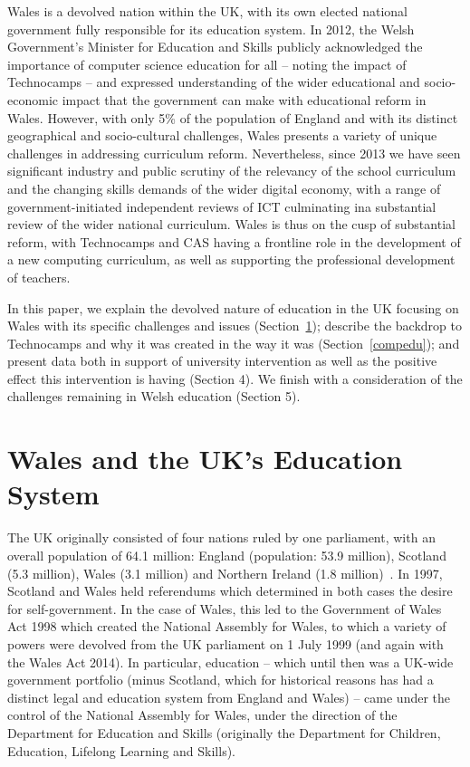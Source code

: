 \documentclass{sig-alternate}
\begin{document}
Wales is a devolved nation within the UK, with its own elected
national government fully responsible for its education system. In
2012, the Welsh Government's Minister for Education and Skills
publicly acknowledged the importance of computer science education for
all -- noting the impact of Technocamps -- and expressed understanding
of the wider educational and socio-economic impact that the government
can make with educational reform in Wales.  However, with only 5\% of
the population of England and with its distinct geographical and
socio-cultural challenges, Wales presents a variety of unique
challenges in addressing curriculum reform. Nevertheless, since 2013
we have seen significant industry and public scrutiny of the relevancy
of the school curriculum and the changing skills demands of the wider
digital economy, with a range of government-initiated independent
reviews of ICT culminating ina substantial review of the wider
national curriculum. Wales is thus on the cusp of substantial reform,
with Technocamps and CAS having a frontline role in the development of
a new computing curriculum, as well as supporting the professional
development of teachers.

In this paper, we explain the devolved nature of education in the UK
focusing on Wales with its specific challenges and issues
(Section~\ref{welshukedu}); describe the backdrop to Technocamps and
why it was created in the way it was (Section~\ref{compedu}); and
present data both in support of university intervention as well as the
positive effect this intervention is having (Section 4).  We finish
with a consideration of the challenges remaining in Welsh education
(Section 5).

\section{Wales and the UK's Education System}\label{welshukedu}

The UK originally consisted of four nations ruled by one parliament,
with an overall population of 64.1 million: England (population: 53.9
million), Scotland (5.3 million), Wales (3.1 million) and Northern
Ireland (1.8 million)~\cite{onspop:2014}. In 1997, Scotland and Wales
held referendums which determined in both cases the desire for
self-government.  In the case of Wales, this led to the Government of
Wales Act 1998 which created the National Assembly for Wales, to which
a variety of powers were devolved from the UK parliament on 1 July
1999 (and again with the Wales Act 2014).  In particular, education --
which until then was a UK-wide government portfolio (minus Scotland,
which for historical reasons has had a distinct legal and education
system from England and Wales) -- came under the control of the
National Assembly for Wales, under the direction of the Department for
Education and Skills (originally the Department for Children,
Education, Lifelong Learning and Skills).
\end{document}
